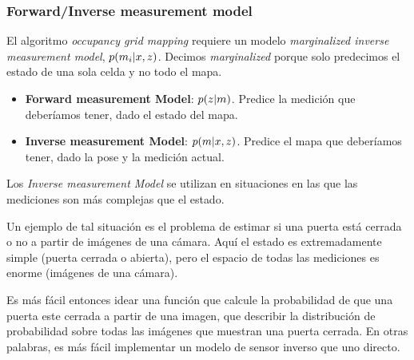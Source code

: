 \begin{frame}
	\frametitle{Forward/Inverse measurement model}
    

    El algoritmo \emph{occupancy grid mapping} requiere un modelo \emph{marginalized inverse measurement model}, $p(m_{i}|x, z )$. Decimos \emph{marginalized} porque solo predecimos el estado de una sola celda y no todo el mapa.

    \begin{itemize}
        \item \textbf{Forward measurement Model}: $p(z | m)$. Predice la medición que deberíamos tener, dado el estado del mapa.
        \item  \textbf{Inverse measurement Model}: $p(m|x, z)$. Predice el mapa que deberíamos tener, dado la pose y la medición actual.
    \end{itemize}

    Los \emph{Inverse measurement Model} se utilizan en situaciones en las que las mediciones son más complejas que el estado. 
        
    Un ejemplo de tal situación es el problema de estimar si una puerta está cerrada o no a partir de imágenes de una cámara. Aquí el estado es extremadamente simple (puerta cerrada o abierta), pero el espacio de todas las mediciones es enorme (imágenes de una cámara).
    
    Es más fácil entonces idear una función que calcule la probabilidad de que una puerta este cerrada a partir de una imagen, que describir la distribución de probabilidad sobre todas las imágenes que muestran una puerta cerrada. En otras palabras, es más fácil implementar un modelo de sensor inverso que uno directo.
    


	


\end{frame}

